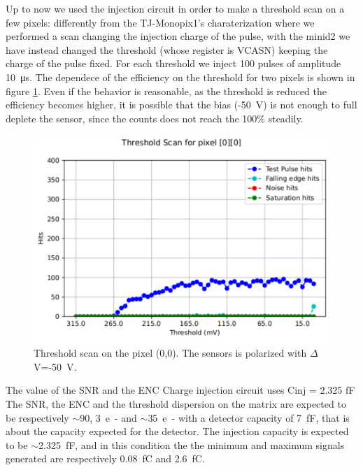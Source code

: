     Up to now we used the injection circuit in order to make a threshold scan on a few pixels: differently from the TJ-Monopix1's charaterization where we performed a scan changing the injection charge of the pulse, with the minid2 we have instead changed the threshold (whose register is VCASN) keeping the charge of the pulse fixed.
    For each threshold we inject 100 pulses of amplitude \SI{10}{\us}. The dependece of the efficiency on the threshold for two pixels is shown in figure \ref{fig:ARCADIA_threshold}.  
    Even if the behavior is reasonable, as the threshold is reduced the efficiency becomes higher, it is possible that the bias (-\SI{50}{V}) is not enough to full deplete the sensor, since the counts does not reach the 100\% steadily. 
    \begin{figure}[h!]
        \centering
        \includegraphics[width=.7\linewidth]{figures/charaterization/ARCADIA/threshold_0_0.pdf}
        \caption{Threshold scan on the pixel (0,0). The sensors is polarized with $\Delta$V=-\SI{50}{V}. }
        \label{fig:ARCADIA_threshold}
    \end{figure} 

    The value of the SNR and the ENC 
    Charge injection circuit uses Cinj = 2.325 fF
    The SNR, the ENC and the threshold dispersion on the matrix are expected to be respectively $\sim$90, \SI{3}{e-} and $\sim$\SI{35}{e-} with a detector capacity of \SI{7}{fF}, that is about the capacity expected for the detector. 
    The injection capacity is expected to be $\sim$\SI{2.325}{fF}, and in this condition the the minimum and maximum signals generated are respectively \SI{0.08}{fC} and \SI{2.6}{fC}.


